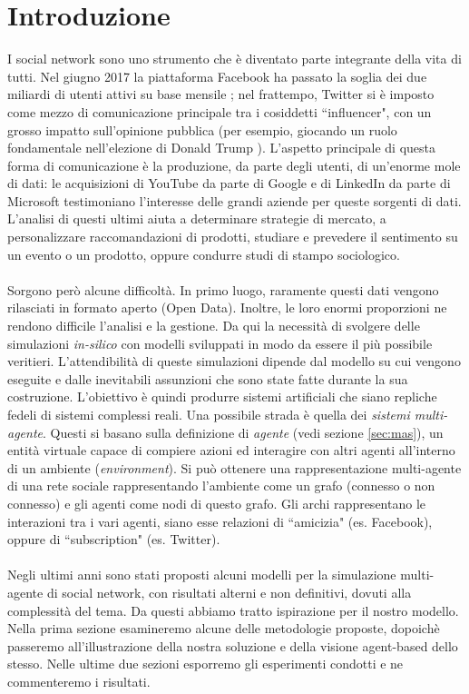 \documentclass[a4paper,12pt]{article}
\begin{document}
\newpage
\tableofcontents
\newpage
\section{Introduzione}
\label{sec:introduction}

I social network sono uno strumento che è diventato parte integrante della vita di tutti. Nel giugno 2017 la piattaforma Facebook ha passato la soglia dei due miliardi di utenti attivi su base mensile \cite{facebook}; nel frattempo, Twitter si è imposto come mezzo di comunicazione principale tra i cosiddetti ``influencer", con un grosso impatto sull'opinione pubblica (per esempio, giocando un ruolo fondamentale nell'elezione di Donald Trump \cite{twitter}). L'aspetto principale di questa forma di comunicazione è la produzione, da parte degli utenti, di un'enorme mole di dati: le acquisizioni di YouTube da parte di Google e di LinkedIn da parte di Microsoft testimoniano l'interesse delle grandi aziende per queste sorgenti di dati. L'analisi di questi ultimi aiuta a determinare strategie di mercato, a personalizzare raccomandazioni di prodotti, studiare e prevedere il sentimento su un evento o un prodotto, oppure condurre studi di stampo sociologico. 
\\
\\
Sorgono però alcune difficoltà. In primo luogo, raramente questi dati vengono rilasciati in formato aperto (Open Data). Inoltre, le loro enormi proporzioni ne rendono difficile l'analisi e la gestione. Da qui la necessità di svolgere delle simulazioni \textit{in-silico} con modelli sviluppati in modo da essere il più possibile veritieri. L'attendibilità di queste simulazioni dipende dal modello su cui vengono eseguite e dalle inevitabili assunzioni che sono state fatte durante la sua costruzione. L'obiettivo è quindi produrre sistemi artificiali che siano repliche fedeli di sistemi complessi reali. Una possibile strada è quella dei \textit{sistemi multi-agente}. Questi si basano sulla definizione di \textit{agente} (vedi sezione \ref{sec:mas}), un entità virtuale \cite{ferber} capace di compiere azioni ed interagire con altri agenti all'interno di un ambiente (\textit{environment}). Si può ottenere una rappresentazione multi-agente di una rete sociale rappresentando l'ambiente come un grafo (connesso o non connesso) e gli agenti come nodi di questo grafo. Gli archi rappresentano le interazioni tra i vari agenti, siano esse relazioni di ``amicizia" (es. Facebook), oppure di ``subscription" (es. Twitter).
\\
\\
Negli ultimi anni sono stati proposti alcuni modelli per la simulazione multi-agente di social network, con risultati alterni e non definitivi, dovuti alla complessità del tema. Da questi abbiamo tratto ispirazione per il nostro modello. Nella prima sezione esamineremo alcune delle metodologie proposte, dopoichè passeremo all'illustrazione della nostra soluzione e della visione agent-based dello stesso. Nelle ultime due sezioni esporremo gli esperimenti condotti e ne commenteremo i risultati.
\end{document}
